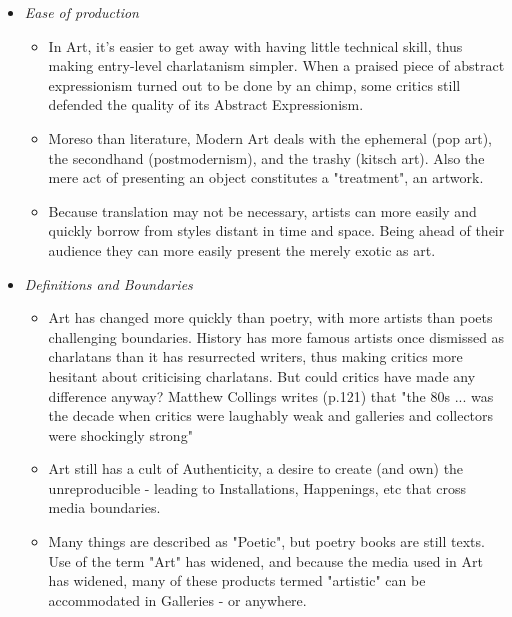 \documentclass[11pt]{article}
\begin{document}
\begin{itemize}
\item \textit{Ease of production}
\begin{itemize}
\item  In Art, it's easier to get away with having little technical skill, thus
making entry-level charlatanism simpler. When a praised
  piece of abstract expressionism turned out to be done by an chimp, some
  critics still defended the quality of its Abstract Expressionism.
\item  Moreso than literature, Modern Art deals with the ephemeral (pop art), 
  the 
  secondhand (postmodernism), and the trashy (kitsch art). Also the mere act of presenting an object constitutes a "treatment",
an artwork.
\item  Because translation may not be necessary, artists can more easily and quickly borrow from styles distant in time and space. Being ahead of their audience they can more easily present the 
  merely exotic as art.

\end{itemize}

\item \textit{Definitions and Boundaries}
\begin{itemize}
\item  Art has changed more quickly than poetry, with more artists than 
poets challenging boundaries. History has more famous artists once
  dismissed as charlatans than it has resurrected writers, thus 
making critics more hesitant about criticising charlatans. But could
critics have made any difference anyway? Matthew Collings
writes (p.121) that "the 80s ... was the decade when critics were laughably weak and 
galleries and collectors were shockingly strong"


\item  Art still has a cult of Authenticity, a desire to create (and own) the 
  unreproducible - leading to  Installations, Happenings, etc that cross
media boundaries.
\item  Many things are described as "Poetic", but poetry books are still texts.
Use of the term "Art" has widened, and because the media
used in Art has widened, many of these products termed "artistic" can be 
accommodated in Galleries - or anywhere.


\end{itemize}
\end{itemize}
\end{document}
